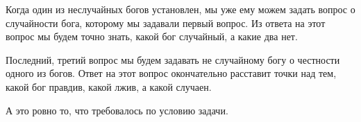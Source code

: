 Когда один из неслучайных богов установлен, мы уже ему можем задать вопрос о случайности бога, которому мы задавали первый вопрос. Из ответа на этот вопрос мы будем точно знать, какой бог случайный, а какие два нет.

Последний, третий вопрос мы будем задавать не случайному богу о честности одного из богов. Ответ на этот вопрос окончательно расставит точки над тем, какой бог правдив, какой лжив, а какой случаен.

А это ровно то, что требовалось по условию задачи.

